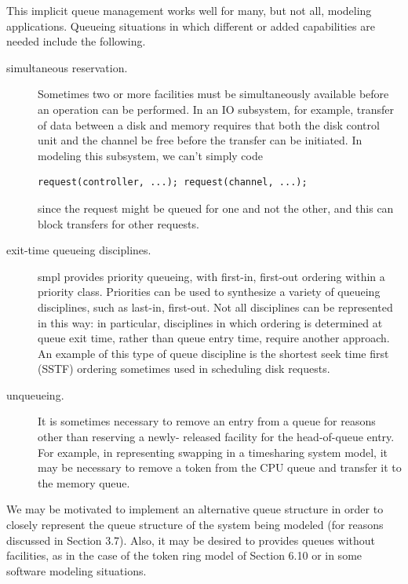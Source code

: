 This implicit queue management works well for many, but not all,
modeling applications. Queueing situations in which different or added
capabilities are needed include the following.

\begin{description}
\item[simultaneous reservation.] Sometimes two or more facilities
must be simultaneously available before an operation can be
performed. In an IO subsystem, for example, transfer of data
between a disk and memory requires that both the disk
control unit and the channel be free before the transfer can be
initiated. In modeling this subsystem, we can't simply code
\begin{verbatim}
request(controller, ...); request(channel, ...);
\end{verbatim}
since the request might be queued for one and not the other,
and this can block transfers for other requests.

\item[exit-time queueing disciplines.] smpl provides priority
queueing, with first-in, first-out ordering within a priority
class. Priorities can be used to synthesize a variety of queueing
disciplines, such as last-in, first-out. Not all disciplines
can be represented in this way: in particular, disciplines in
which ordering is determined at queue exit time, rather than
queue entry time, require another approach. An example of
this type of queue discipline is the shortest seek time first
(SSTF) ordering sometimes used in scheduling disk requests.

\item[unqueueing.] It is sometimes necessary to remove an entry
from a queue for reasons other than reserving a newly-
released facility for the head-of-queue entry. For example,
in representing swapping in a timesharing system model, it
may be necessary to remove a token from the CPU queue and
transfer it to the memory queue.
\end{description}

We may be motivated to implement an alternative queue structure in order to
closely represent the queue structure of the system being modeled (for reasons
discussed in Section 3.7). Also, it may be desired to provides queues without
facilities, as in the case of the token ring model of Section 6.10 or in some
software modeling situations.

